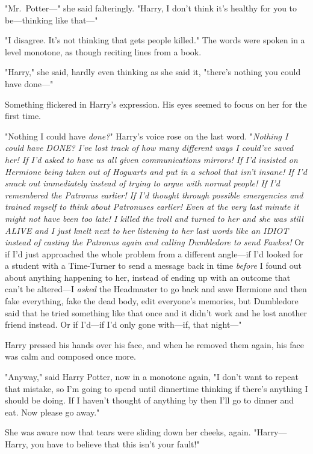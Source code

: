 "Mr.~Potter---" she said falteringly. "Harry, I don't think it's healthy for 
you to be---thinking like that---"

"I disagree. It's not thinking that gets people killed." The words were spoken 
in a level monotone, as though reciting lines from a book.

"Harry," she said, hardly even thinking as she said it, "there's nothing you 
could have done---"

Something flickered in Harry's expression. His eyes seemed to focus on her for 
the first time.

"Nothing I could have \emph{done?}" Harry's voice rose on the last word. 
"\emph{Nothing I could have DONE? I've lost track of how many different ways I 
could've saved her! If I'd asked to have us all given communications mirrors! 
If I'd insisted on Hermione being taken out of Hogwarts and put in a school 
that isn't insane! If I'd snuck out immediately instead of trying to argue with 
normal people! If I'd remembered the Patronus earlier! If I'd thought through 
possible emergencies and trained myself to think about Patronuses earlier! Even 
at the very last minute it might not have been too late! I killed the troll and 
turned to her and she was still ALIVE and I just knelt next to her listening to 
her last words like an IDIOT instead of casting the Patronus again and calling 
Dumbledore to send Fawkes!} Or if I'd just approached the whole problem from a 
different angle---if I'd looked for a student with a Time-Turner to send a 
message back in time \emph{before} I found out about anything happening to her, 
instead of ending up with an outcome that can't be altered---I \emph{asked} the 
Headmaster to go back and save Hermione and then fake everything, fake the dead 
body, edit everyone's memories, but Dumbledore said that he tried something 
like that once and it didn't work and he lost another friend instead. Or if 
I'd---if I'd only gone with---if, that night---"

Harry pressed his hands over his face, and when he removed them again, his face 
was calm and composed once more.

"Anyway," said Harry Potter, now in a monotone again, "I don't want to repeat 
that mistake, so I'm going to spend until dinnertime thinking if there's 
anything I should be doing. If I haven't thought of anything by then I'll go to 
dinner and eat. Now please go away."

She was aware now that tears were sliding down her cheeks, again. 
"Harry---Harry, you have to believe that this isn't your fault!"

